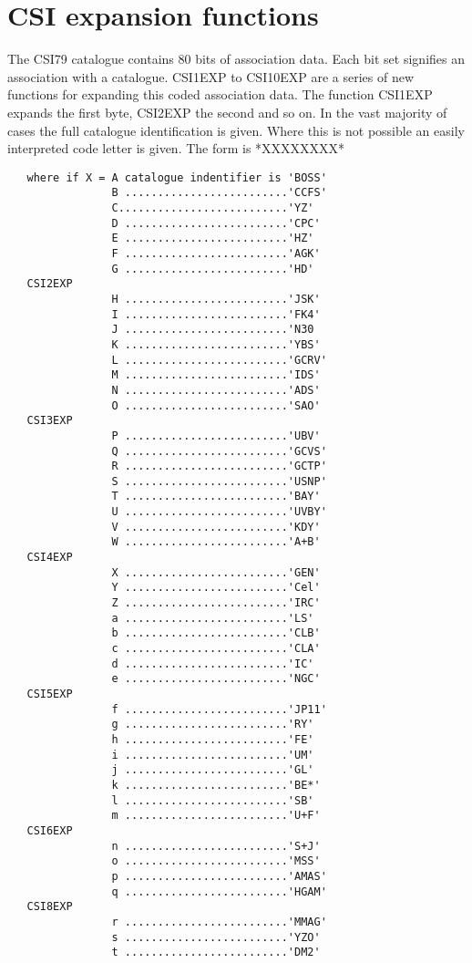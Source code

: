\section {CSI expansion functions}
The CSI79 catalogue contains 80 bits of association data. Each bit set signifies
an association with a catalogue.
CSI1EXP to CSI10EXP are a series of new functions for expanding this coded
association data. The function CSI1EXP expands
the first byte, CSI2EXP the second and so on. In the vast majority of cases
the full catalogue identification is given. Where this is not possible
an easily interpreted code letter is given. The form is
*XXXXXXXX*
\begin{verbatim}
   where if X = A catalogue indentifier is 'BOSS'
                B .........................'CCFS'
                C..........................'YZ'
                D .........................'CPC'
                E .........................'HZ'
                F .........................'AGK'
                G .........................'HD'
   CSI2EXP
                H .........................'JSK'
                I .........................'FK4'
                J .........................'N30
                K .........................'YBS'
                L .........................'GCRV'
                M .........................'IDS'
                N .........................'ADS'
                O .........................'SAO'
   CSI3EXP 
                P .........................'UBV'
                Q .........................'GCVS'
                R .........................'GCTP'
                S .........................'USNP'
                T .........................'BAY'
                U .........................'UVBY'
                V .........................'KDY'
                W .........................'A+B'
   CSI4EXP
                X .........................'GEN'
                Y .........................'Cel'
                Z .........................'IRC'
                a .........................'LS'
                b .........................'CLB'
                c .........................'CLA'
                d .........................'IC'
                e .........................'NGC'
   CSI5EXP
                f .........................'JP11'
                g .........................'RY'
                h .........................'FE'
                i .........................'UM'
                j .........................'GL'
                k .........................'BE*'
                l .........................'SB'
                m .........................'U+F'
   CSI6EXP
                n .........................'S+J'
                o .........................'MSS'
                p .........................'AMAS'
                q .........................'HGAM'
   CSI8EXP
                r .........................'MMAG'
                s .........................'YZO'
                t .........................'DM2'

\end{verbatim}
 

